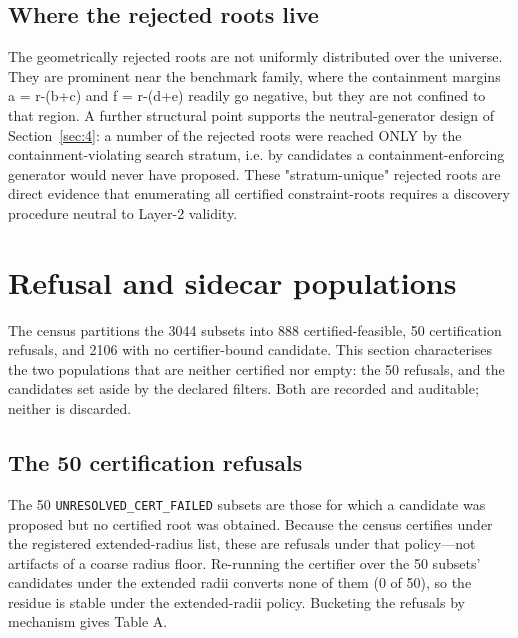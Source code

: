 \documentclass[pdflatex,sn-mathphys-num]{sn-jnl}
\begin{document}
\subsection{Where the rejected roots live}\label{sec:6.4}

The geometrically rejected roots are not uniformly distributed over the universe. They are prominent near the benchmark family, where the containment margins a = r-(b+c) and f = r-(d+e) readily go negative, but they are not confined to that region. A further structural point supports the neutral-generator design of Section~\ref{sec:4}: a number of the rejected roots were reached ONLY by the containment-violating search stratum, i.e. by
candidates a containment-enforcing generator would never have proposed. These "stratum-unique" rejected roots are direct evidence that enumerating all certified constraint-roots requires a discovery procedure neutral to Layer-2 validity.

\section{Refusal and sidecar populations}\label{sec:7}

The census partitions the 3044 subsets into 888 certified-feasible, 50 certification refusals, and 2106 with no certifier-bound candidate. This section characterises the two populations that are neither certified nor empty: the 50 refusals, and the candidates set aside by the declared filters. Both are recorded and auditable; neither is discarded.

\subsection{The 50 certification refusals}\label{sec:7.1}

The 50 \texttt{UNRESOLVED\_CERT\_FAILED} subsets are those for which a candidate was proposed but no certified root was obtained. Because the census certifies under the registered extended-radius list, these are refusals under that policy---not artifacts of a coarse radius floor. Re-running the certifier over
the 50 subsets' candidates under the extended radii converts none of them (0 of 50), so the residue is stable under the extended-radii policy. Bucketing the refusals by mechanism gives Table A.
\end{document}
